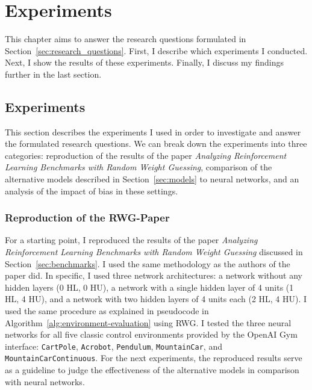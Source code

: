 
\chapter{Experiments}
\label{ch:experiments}
This chapter aims to answer the research questions formulated in Section~\ref{sec:research_questions}. First, I describe which experiments I conducted. Next, I show the results of these experiments. Finally, I discuss my findings further in the last section.

\section{Experiments}
This section describes the experiments I used in order to investigate and answer the formulated research questions. We can break down the experiments into three categories: reproduction of the results of the paper \emph{Analyzing Reinforcement Learning Benchmarks with Random Weight Guessing}, comparison of the alternative models described in Section~\ref{sec:models} to neural networks, and an analysis of the impact of bias in these settings.

\subsection{Reproduction of the RWG-Paper}
For a starting point, I reproduced the results of the paper \emph{Analyzing Reinforcement Learning Benchmarks with Random Weight Guessing} discussed in Section~\ref{sec:benchmarks}. I used the same methodology as the authors of the paper did. In specific, I used three network architectures: a network without any hidden layers (0 HL, 0 HU), a network with a single hidden layer of 4 units (1 HL, 4 HU), and a network with two hidden layers of 4 units each (2 HL, 4 HU). I used the same procedure as explained in pseudocode in Algorithm~\ref{alg:environment-evaluation} using RWG. I tested the three neural networks for all five classic control environments provided by the OpenAI Gym interface: \verb|CartPole|, \verb|Acrobot|, \verb|Pendulum|, \verb|MountainCar|, and \verb|MountainCarContinuous|. For the next experiments, the reproduced results serve as a guideline to judge the effectiveness of the alternative models in comparison with neural networks.

